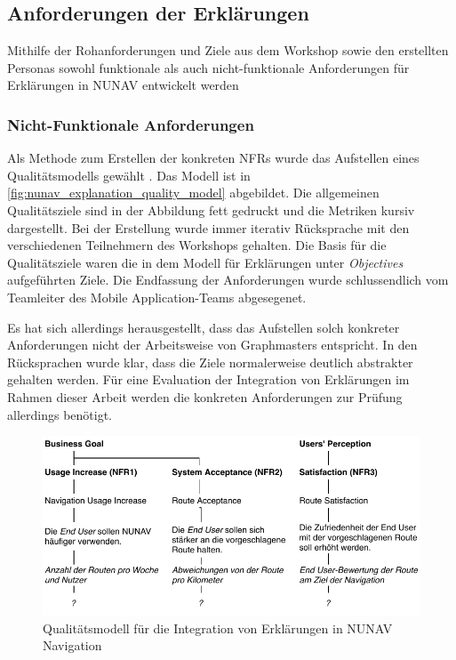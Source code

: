 \subsection{Anforderungen der Erklärungen}

Mithilfe der Rohanforderungen und Ziele aus dem Workshop sowie den erstellten Personas sowohl funktionale als auch nicht-funktionale Anforderungen für Erklärungen in NUNAV entwickelt werden

\subsubsection{Nicht-Funktionale Anforderungen}


Als Methode zum Erstellen der konkreten NFRs wurde das Aufstellen eines Qualitätsmodells gewählt \cite{schneider2012abenteuer}. Das Modell ist in \autoref{fig:nunav_explanation_quality_model} abgebildet. Die allgemeinen Qualitätsziele sind in der Abbildung fett gedruckt und die Metriken kursiv dargestellt. Bei der Erstellung wurde immer iterativ Rücksprache mit den verschiedenen Teilnehmern des Workshops gehalten. Die Basis für die Qualitätsziele waren die in dem Modell für Erklärungen unter \textit{Objectives} aufgeführten Ziele. Die Endfassung der Anforderungen wurde schlussendlich vom Teamleiter des \glqq Mobile Application\grqq{}-Teams abgesegenet.

Es hat sich allerdings herausgestellt, dass das Aufstellen solch konkreter Anforderungen nicht der Arbeitsweise von Graphmasters entspricht. In den Rücksprachen wurde klar, dass die Ziele normalerweise deutlich abstrakter gehalten werden. Für eine Evaluation der Integration von Erklärungen im Rahmen dieser Arbeit werden die konkreten Anforderungen zur Prüfung allerdings benötigt.

\begin{figure}[htb!]
    \centering
    \includegraphics[width=\textwidth]{contents/06_model_evaluation/01_integration/res/quality_model.pdf}
    \caption{Qualitätsmodell für die Integration von Erklärungen in NUNAV Navigation}
    \label{fig:nunav_explanation_quality_model}
\end{figure}

